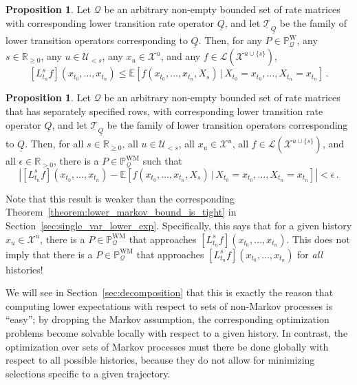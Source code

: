\documentclass[10pt]{paper}
\theoremstyle{definition}
\newtheorem{proposition}[theorem]{Proposition}
\newcommand{\reals}{\mathbb{R}}
\newcommand{\realspos}{\reals_{>0}}
\newcommand{\realsnonneg}{\reals_{\geq 0}}
\newcommand{\states}{\mathcal{X}}
\newcommand{\processes}{\mathbb{P}}
\newcommand{\wprocesses}{\processes^{\mathrm{W}}}
\newcommand{\wmprocesses}{\processes^{\mathrm{WM}}}
\newcommand{\gambles}{\mathcal{L}}
\newcommand{\rateset}{\mathcal{Q}}
\newcommand{\lrate}{\underline{Q}}
\newcommand{\abs}[1]{\left\vert #1 \right\vert}
\begin{document}
\begin{proposition}\label{prop:multi_var_single_future_bounded}
Let $\rateset$ be an arbitrary non-empty bounded set of rate matrices with corresponding lower transition rate operator $\lrate$, and let $\underline{\mathcal{T}}_{\lrate}$ be the family of lower transition operators corresponding to $\lrate$. Then, for any $P\in\wprocesses_\rateset$, any $s\in\realsnonneg$, any $u\in\mathcal{U}_{<s}$, any $x_u\in\states^u$, and any $f\in\gambles(\states^{u\cup\{s\}})$,
\begin{equation*}
\left[L_{t_n}^sf\right](x_{t_0},\ldots,x_{t_n}) \leq \mathbb{E}\left[f(x_{t_0},\ldots,x_{t_n},X_s)\,\vert\,X_{t_0}=x_{t_0},\ldots,X_{t_n}=x_{t_n}\right]\,.
\end{equation*}
\end{proposition}

\begin{proposition}\label{prop:multi_var_single_future_tight}
Let $\rateset$ be an arbitrary non-empty bounded set of rate matrices that has separately specified rows, with corresponding lower transition rate operator $\lrate$, and let $\underline{\mathcal{T}}_{\lrate}$ be the family of lower transition operators corresponding to $\lrate$. Then, for all $s\in\realsnonneg$, all $u\in\mathcal{U}_{<s}$, all $x_u\in\states^u$, all $f\in\gambles(\states^{u\cup\{s\}})$, and all $\epsilon\in\realspos$, there is a $P\in\wmprocesses_\rateset$ such that
\begin{equation*}
\abs{\left[L_{t_n}^sf\right](x_{t_0},\ldots,x_{t_n}) - \mathbb{E}\left[f(x_{t_0},\ldots,x_{t_n},X_s)\,\vert\,X_{t_0}=x_{t_0},\ldots,X_{t_n}=x_{t_n}\right]} < \epsilon\,.
\end{equation*}
\end{proposition}

Note that this result is weaker than the corresponding Theorem~\ref{theorem:lower_markov_bound_is_tight} in Section~\ref{sec:single_var_lower_exp}. Specifically, this says that for a given history $x_u\in\states^u$, there is a $P\in\wmprocesses_\rateset$ that approaches $\left[L_{t_n}^sf\right](x_{t_0},\ldots,x_{t_n})$. This does not imply that there is a $P\in\wmprocesses_\rateset$ that approaches $\left[L_{t_n}^sf\right](x_{t_0},\ldots,x_{t_n})$ for \emph{all} histories! 

We will see in Section~\ref{sec:decomposition} that this is exactly the reason that computing lower expectations with respect to sets of non-Markov processes is ``easy''; by dropping the Markov assumption, the corresponding optimization problems become solvable locally with respect to a given history. In contrast, the optimization over sets of Markov processes must there be done globally with respect to all possible histories, because they do not allow for minimizing selections specific to a given trajectory.
\end{document}
